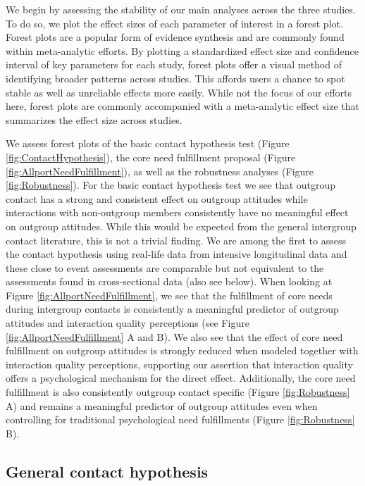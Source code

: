 We begin by assessing the stability of our main analyses across the
three studies. To do so, we plot the effect sizes of each parameter of
interest in a forest plot. Forest plots are a popular form of evidence
synthesis and are commonly found within meta-analytic efforts. By
plotting a standardized effect size and confidence interval of key
parameters for each study, forest plots offer a visual method of
identifying broader patterns across studies. This affords users a chance
to spot stable as well as unreliable effects more easily. While not the
focus of our efforts here, forest plots are commonly accompanied with a
meta-analytic effect size that summarizes the effect size across
studies.

We assess forest plots of the basic contact hypothesis test (Figure
\ref{fig:ContactHypothesis}), the core need fulfillment proposal (Figure
\ref{fig:AllportNeedFulfillment}), as well as the robustness analyses
(Figure \ref{fig:Robustness}). For the basic contact hypothesis test we
see that outgroup contact has a strong and consistent effect on outgroup
attitudes while interactions with non-outgroup members consistently have
no meaningful effect on outgroup attitudes. While this would be expected
from the general intergroup contact literature, this is not a trivial
finding. We are among the first to assess the contact hypothesis using
real-life data from intensive longitudinal data and these close to event
assessments are comparable but not equivalent to the assessments found
in cross-sectional data (also see below). When looking at Figure
\ref{fig:AllportNeedFulfillment}, we see that the fulfillment of core
needs during intergroup contacts is consistently a meaningful predictor
of outgroup attitudes and interaction quality perceptions (see Figure
\ref{fig:AllportNeedFulfillment} A and B). We also see that the effect
of core need fulfillment on outgroup attitudes is strongly reduced when
modeled together with interaction quality perceptions, supporting our
assertion that interaction quality offers a psychological mechanism for
the direct effect. Additionally, the core need fulfillment is also
consistently outgroup contact specific (Figure \ref{fig:Robustness} A)
and remains a meaningful predictor of outgroup attitudes even when
controlling for traditional psychological need fulfillments (Figure
\ref{fig:Robustness} B).

\subsection{General contact hypothesis}

